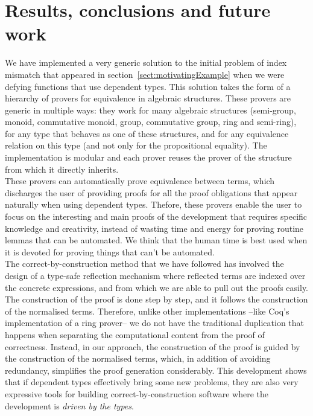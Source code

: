 \section{Results, conclusions and future work}

We have implemented a very generic solution to the initial problem of index mismatch that appeared in section~\ref{sect:motivatingExample} when we were defying functions that use dependent types. This solution takes the form of a hierarchy of provers for equivalence in algebraic structures. These provers are generic in multiple ways: they work for many algebraic structures (semi-group, monoid, commutative monoid, group, commutative group, ring and semi-ring), for any type that behaves as one of these structures, and for any equivalence relation on this type (and not only for the propositional equality). The implementation is modular and each prover reuses the prover of the structure from which it directly inherits. \\

These provers can automatically prove equivalence between terms, which discharges the user of providing proofs for all the proof obligations that appear naturally when using dependent types. Thefore, these provers enable the user to focus on the interesting and main proofs of the development that requires specific knowledge and creativity, instead of wasting time and energy for proving routine lemmas that can be automated. We think that the human time is best used when it is devoted for proving things that can't be automated. \\

The correct-by-construction method that we have followed has involved the design of a type-safe reflection mechanism where reflected terms are indexed over the concrete expressions, and from which we are able to pull out the proofs easily. The construction of the proof is done step by step, and it follows the construction of the normalised terms. Therefore, unlike other implementations --like Coq's implementation of a ring prover-- we do not have the traditional duplication that happens when separating the computational content from the proof of correctness. Instead, in our approach, the construction of the proof is guided by the construction of the normalised terms, which, in addition of avoiding redundancy, simplifies the proof generation considerably. This development shows that if dependent types effectively bring some new problems, they are also very expressive tools for building correct-by-construction software where the development is \emph{driven by the types}. \\

